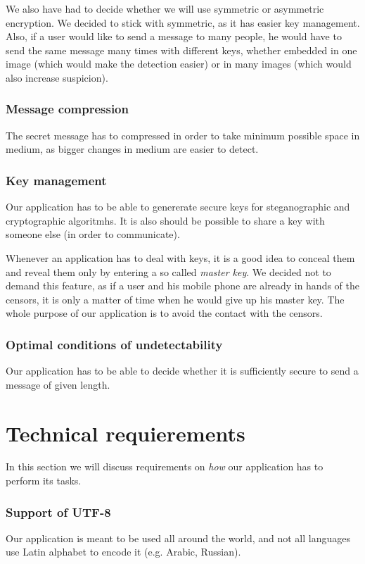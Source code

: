 We also have had to decide whether we will use symmetric or asymmetric
encryption. We decided to stick with symmetric, as it has easier key management.
Also, if a user would like to send a message to many people, he would have to
send the same message many times with different keys, whether embedded in one 
image (which would make the detection easier) or in many images (which would
also increase suspicion).

\subsubsection{Message compression}
The secret message has to compressed in order to take minimum possible space in medium,
as bigger changes in medium are easier to detect.

\subsubsection{Key management}
Our application has to be able to genererate secure keys for steganographic and
cryptographic algoritmhs. It is also should be possible to share a key with someone
else (in order to communicate).

Whenever an application has to deal with keys, it is a good idea to conceal them
and reveal them only by entering a so called \emph{master key}. We decided not to demand
this feature, as if a user and his mobile phone are already in hands of the censors, it is only 
a matter of time when he would give up his master key. The whole purpose of our application
is to avoid the contact with the censors.

\subsubsection{Optimal conditions of undetectability}
Our application has to be able to decide whether it is sufficiently secure to 
send a message of given length. 



\section{Technical requierements}
In this section we will discuss requirements on \emph{how} our application has
to perform its tasks.

\subsubsection{Support of UTF-8}
Our application is meant to be used all around the world, and not all languages use
Latin alphabet to encode it (e.g. Arabic, Russian). 

